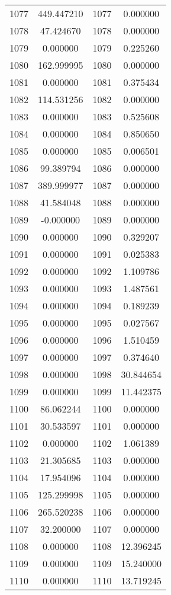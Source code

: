 \documentclass[12pt]{article}
\begin{document}
\begin{longtable}{@{}cccc@{}}
1077 & 449.447210 & 1077 & 0.000000 \\
1078 & 47.424670 & 1078 & 0.000000 \\
1079 & 0.000000 & 1079 & 0.225260 \\
1080 & 162.999995 & 1080 & 0.000000 \\
1081 & 0.000000 & 1081 & 0.375434 \\
1082 & 114.531256 & 1082 & 0.000000 \\
1083 & 0.000000 & 1083 & 0.525608 \\
1084 & 0.000000 & 1084 & 0.850650 \\
1085 & 0.000000 & 1085 & 0.006501 \\
1086 & 99.389794 & 1086 & 0.000000 \\
1087 & 389.999977 & 1087 & 0.000000 \\
1088 & 41.584048 & 1088 & 0.000000 \\
1089 & -0.000000 & 1089 & 0.000000 \\
1090 & 0.000000 & 1090 & 0.329207 \\
1091 & 0.000000 & 1091 & 0.025383 \\
1092 & 0.000000 & 1092 & 1.109786 \\
1093 & 0.000000 & 1093 & 1.487561 \\
1094 & 0.000000 & 1094 & 0.189239 \\
1095 & 0.000000 & 1095 & 0.027567 \\
1096 & 0.000000 & 1096 & 1.510459 \\
1097 & 0.000000 & 1097 & 0.374640 \\
1098 & 0.000000 & 1098 & 30.844654 \\
1099 & 0.000000 & 1099 & 11.442375 \\
1100 & 86.062244 & 1100 & 0.000000 \\
1101 & 30.533597 & 1101 & 0.000000 \\
1102 & 0.000000 & 1102 & 1.061389 \\
1103 & 21.305685 & 1103 & 0.000000 \\
1104 & 17.954096 & 1104 & 0.000000 \\
1105 & 125.299998 & 1105 & 0.000000 \\
1106 & 265.520238 & 1106 & 0.000000 \\
1107 & 32.200000 & 1107 & 0.000000 \\
1108 & 0.000000 & 1108 & 12.396245 \\
1109 & 0.000000 & 1109 & 15.240000 \\
1110 & 0.000000 & 1110 & 13.719245 \\

\end{longtable}
\end{document}
